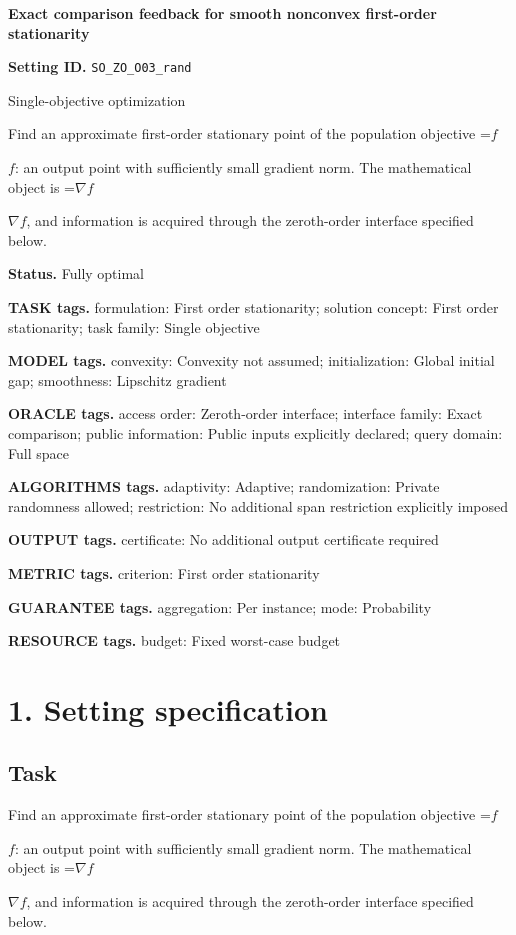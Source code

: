 \documentclass[10pt,a4paper]{article}
\newcommand{\AtlasMath}[1]{\par\begingroup\centering\setbox0=\hbox{$\displaystyle #1$}\ifdim\wd0>1.4\linewidth\typeout{ATLAS WIDE FORMULA: \the\wd0}\fi\ifdim\wd0>\linewidth\resizebox{\linewidth}{!}{\box0}\else\box0\fi\par\endgroup}
\newcommand{\AtlasInlineMath}[1]{\begingroup\setbox0=\hbox{$#1$}\ifdim\wd0>.4\linewidth\endgroup\AtlasMath{#1}\else\endgroup$#1$\fi}
\begin{document}
\raggedright

{\LARGE\bfseries\sffamily\color{AtlasNavy} Exact comparison feedback for smooth nonconvex first-order stationarity\par}\vspace{5pt}
\textbf{Setting ID.} \texttt{SO\_\allowbreak{}ZO\_\allowbreak{}O03\_\allowbreak{}rand}

Single-objective optimization

Find an approximate first-order stationary point of the population objective \AtlasInlineMath{f}: an output point with sufficiently small gradient norm. The mathematical object is \AtlasInlineMath{\nabla f}, and information is acquired through the zeroth-order interface specified below.

\textbf{Status.} Fully optimal

\textbf{TASK tags.} formulation: First order stationarity; solution concept: First order stationarity; task family: Single objective

\textbf{MODEL tags.} convexity: Convexity not assumed; initialization: Global initial gap; smoothness: Lipschitz gradient

\textbf{ORACLE tags.} access order: Zeroth-order interface; interface family: Exact comparison; public information: Public inputs explicitly declared; query domain: Full space

\textbf{ALGORITHMS tags.} adaptivity: Adaptive; randomization: Private randomness allowed; restriction: No additional span restriction explicitly imposed

\textbf{OUTPUT tags.} certificate: No additional output certificate required

\textbf{METRIC tags.} criterion: First order stationarity

\textbf{GUARANTEE tags.} aggregation: Per instance; mode: Probability

\textbf{RESOURCE tags.} budget: Fixed worst-case budget

\section{1. Setting specification}
\subsection{Task}
Find an approximate first-order stationary point of the population objective \AtlasInlineMath{f}: an output point with sufficiently small gradient norm. The mathematical object is \AtlasInlineMath{\nabla f}, and information is acquired through the zeroth-order interface specified below.
\end{document}

